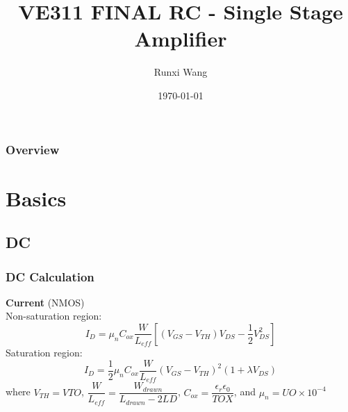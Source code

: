 \documentclass{beamer}
\title[Short title]{VE311 FINAL RC - Single Stage Amplifier} %
\author{Runxi Wang} %
\institute[UN-SJTU JI] %
{
UM-SJTU JI \\ %
\medskip
\textit{wangrunxi@sjtu.edu.cn} %
}
\date{\today} %
\begin{document}
\begin{frame}
\titlepage %
\end{frame}

\begin{frame}
\frametitle{Overview} %
\tableofcontents %
\end{frame}

\section{Basics}
\subsection{DC}
\begin{frame}
    \frametitle{DC Calculation}
    \textbf{Current} (NMOS)\\
    Non-saturation region:
    \begin{equation*}
        \boxed{I_D = \mu_nC_{ox}\frac{W}{L_{eff}}\left[ (V_{GS}-V_{TH})V_{DS} -\frac{1}{2}V_{DS}^2\right]}
    \end{equation*}
    Saturation region:
    \begin{equation*}
        \boxed{I_D = \frac{1}{2}\mu_nC_{ox}\frac{W}{L_{eff}}(V_{GS}-V_{TH})^2(1+\lambda V_{DS})}
    \end{equation*}
    where $V_{TH} = VTO$, $\dfrac{W}{L_{eff}} = \dfrac{W_{drawn}}{L_{drawn}-2LD}$, $C_{ox} = \dfrac{\epsilon_r\epsilon_0}{TOX}$, and $\mu_n = UO\times 10^{-4}$
\end{frame}
\end{document}
